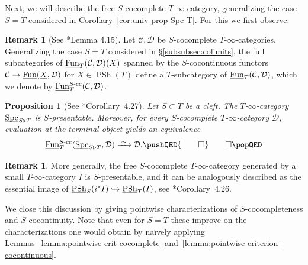 \documentclass[reqno]{memo-l}
\theoremstyle{mythm}
\newtheorem{prop}[thm]{Proposition}
\theoremstyle{definition}
\newtheorem{rk}[thm]{Remark}
\numberwithin{equation}{section}
\newcommand{\qednow}{\pushQED{\qed}\qedhere\popQED}
\newcommand{\Cc}{{\mathcal{C}}}
\newcommand{\Dd}{{\mathcal{D}}}
\DeclareMathOperator{\Spc}{Spc}
\newcommand{\Fun}{{\textup{Fun}}}
\DeclareMathOperator{\PSh}{PSh}
\newcommand{\ulhelper}[2]{\underline{\setbox0=\hbox{$#1#2$}\dp0=0.4pt \box0\relax}}
\newcommand{\ul}[1]{{\mathpalette\ulhelper{#1}}\hbox{\rule[-2pt]{0pt}{0pt}}}
\newcommand{\iso}{\xrightarrow{\;\smash{\raisebox{-0.25ex}{\ensuremath{\scriptstyle\sim}}}\;}}
\begin{document}
Next, we will describe the free $S$-cocomplete $T$-$\infty$-category, generalizing the case $S=T$ considered in Corollary~\ref{cor:univ-prop-Spc-T}. For this we first observe:

\begin{rk}[See \cite{CLL_Clefts}*{Lemma 4.15}]
    Let $\Cc,\Dd$ be $S$-cocomplete $T$-$\infty$-categories. Generalizing the case $S=T$ considered in §\ref{subsubsec:colimits}, the full subcategories of $\ul\Fun_T(\Cc,\Dd)(X)$ spanned by the $S$-cocontinuous functors $\Cc\to\ul\Fun(\ul X,\Dd)$ for $X\in\PSh(T)$ define a $T$-subcategory of $\ul\Fun_T(\Cc,\Dd)$, which we denote by $\ul\Fun_T^\text{$S$-cc}(\Cc,\Dd)$.
\end{rk}

\begin{prop}[See \cite{CLL_Clefts}*{Corollary~4.27}]\label{prop:Spc-S-T-univ-prop}
    Let $S\subset T$ be a cleft. The $T$-$\infty$-category $\ul\Spc_{S\triangleright T}$ is $S$-presentable. Moreover, for every $S$-cocomplete $T$-$\infty$-category $\Dd$, evaluation at the terminal object yields an equivalence
    \[
        \ul\Fun^\textup{$S$-cc}_T(\ul\Spc_{S\triangleright T},\Dd)\iso\Dd.\qednow
    \]
\end{prop}

\begin{rk}\label{rk:PSh-ST}
    More generally, the free $S$-cocomplete $T$-$\infty$-category generated by a small $T$-$\infty$-category $I$ is $S$-presentable, and it can be analogously described as the essential image of $\ul\PSh_S(i^*I)\hookrightarrow\ul\PSh_T(I)$, see \cite{CLL_Clefts}*{Corollary~4.26}.
\end{rk}

We close this discussion by giving pointwise characterizations of $S$-{\hskip0pt}cocompleteness and $S$-cocontinuity. Note that even for $S=T$ these improve on the characterizations one would obtain by na\"ively applying Lemmas~\ref{lemma:pointwise-crit-cocomplete} and~\ref{lemma:pointwise-criterion-cocontinuous}.
\end{document}
